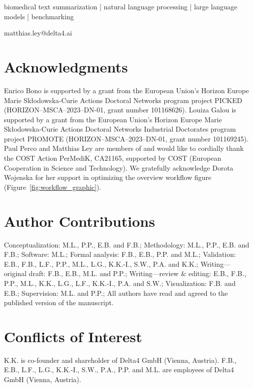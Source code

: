 \begin{keywords}
biomedical text summarization | natural language processing | large language models | benchmarking
\end{keywords}

\begin{corrauthor}
matthias.ley@delta4.ai
\end{corrauthor}













\section*{Acknowledgments}
Enrico Bono is supported by a grant from the European Union’s Horizon Europe Marie Skłodowska-Curie Actions Doctoral Networks program project PICKED (HORIZON--MSCA--2023--DN-01, grant number 101168626). 
Louiza Galou is supported by a grant from the European Union’s Horizon Europe Marie Skłodowska-Curie Actions Doctoral Networks Industrial Doctorates program project PROMOTE (HORIZON--MSCA--2023--DN-01, grant number 101169245). 
Paul Perco and Matthias Ley are members of and would like to cordially thank the COST Action PerMediK, CA21165, supported by COST (European Cooperation in Science and Technology).
We gratefully acknowledge Dorota Wojenska for her support in optimizing the overview workflow figure (Figure~\ref{fig:workflow_graphic}).

\section*{Author Contributions}
Conceptualization: M.L., P.P., E.B. and F.B.; 
Methodology: M.L., P.P., E.B. and F.B.; 
Software: M.L.; 
Formal analysis: F.B., E.B., P.P. and M.L.; 
Validation: E.B., F.B., L.F., P.P., M.L., L.G., K.K.-I., S.W., P.A. and K.K.; 
Writing---original draft: F.B., E.B., M.L. and P.P.; 
Writing---review \& editing: E.B., F.B., P.P., M.L., K.K., L.G., L.F., K.K.-I., P.A. and S.W.; 
Visualization: F.B. and E.B.; 
Supervision: M.L. and P.P.;
All authors have read and agreed to the published version of the manuscript.

\section*{Conflicts of Interest}
K.K. is co-founder and shareholder of Delta4 GmbH (Vienna, Austria). 
F.B., E.B., L.F., L.G., K.K.-I., S.W., P.A., P.P. and M.L. are employees of Delta4 GmbH (Vienna, Austria).

